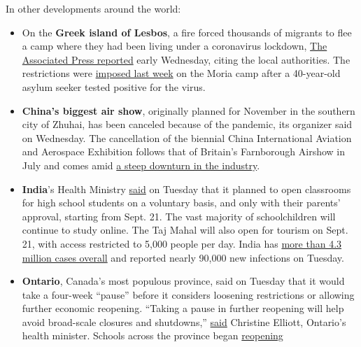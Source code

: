 In other developments around the world:

\begin{itemize}
\item
  On the \textbf{Greek island of Lesbos}, a fire forced thousands of
  migrants to flee a camp where they had been living under a coronavirus
  lockdown,
  \href{https://www.nytimes3xbfgragh.onion/aponline/2020/09/08/world/europe/ap-eu-greece-migrant-camp-blaze-1st-ld-writethru.html}{The
  Associated Press reported} early Wednesday, citing the local
  authorities. The restrictions were
  \href{https://www.nytimes3xbfgragh.onion/reuters/2020/09/07/world/europe/07reuters-health-coronavirus-greece-migrants.html}{imposed
  last week} on the Moria camp after a 40-year-old asylum seeker tested
  positive for the virus.
\item
  \textbf{China's biggest air show}, originally planned for November in
  the southern city of Zhuhai, has been canceled because of the
  pandemic, its organizer said on Wednesday. The cancellation of the
  biennial China International Aviation and Aerospace Exhibition follows
  that of Britain's Farnborough Airshow in July and comes amid
  \href{https://www.nytimes3xbfgragh.onion/2020/05/10/business/airlines-coronavirus-bleak-future.html}{a
  steep downturn in the industry}.
\item
  \textbf{India}'s Health Ministry
  \href{https://www.mohfw.gov.in/pdf/FinalSOPonpartialresumptionofactivitiesinschools8092020.pdf}{said}
  on Tuesday that it planned to open classrooms for high school students
  on a voluntary basis, and only with their parents' approval, starting
  from Sept. 21. The vast majority of schoolchildren will continue to
  study online. The Taj Mahal will also open for tourism on Sept. 21,
  with access restricted to 5,000 people per day. India has
  \href{https://www.nytimes3xbfgragh.onion/interactive/2020/world/asia/india-coronavirus-cases.html}{more
  than 4.3 million cases overall} and reported nearly 90,000 new
  infections on Tuesday.
\item
  \textbf{Ontario}, Canada's most populous province, said on Tuesday
  that it would take a four-week ``pause'' before it considers loosening
  restrictions or allowing further economic reopening. ``Taking a pause
  in further reopening will help avoid broad-scale closures and
  shutdowns,''
  \href{https://twitter.com/celliottability/status/1303393588265484293}{said}
  Christine Elliott, Ontario's health minister. Schools across the
  province began
  \href{https://www.nytimes3xbfgragh.onion/2020/09/04/world/canada/your-thoughts-on-an-anxious-and-uncertain-return-to-classes.html}{reopening}

\end{itemize}
